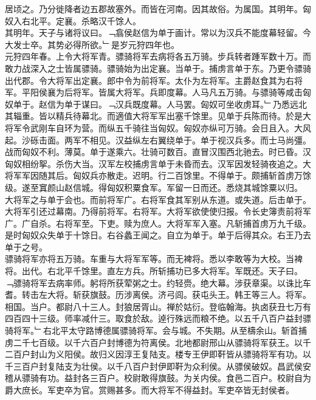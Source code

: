 \documentclass{zhvt-classic}
\begin{document}
\hspace*{2em}居顷之。乃分徙降者边五郡故塞外。而皆在河南。因其故俗。为属国。其明年。匈奴入右北平。定襄。杀略汉千馀人。\\
\hspace*{2em}其明年。天子与诸将议曰。﹁翕侯赵信为单于画计。常以为汉兵不能度幕轻留。今大发士卒。其势必得所欲。﹂是岁元狩四年也。\\
\hspace*{2em}元狩四年春。上令大将军青。骠骑将军去病将各五万骑。步兵转者踵军数十万。而敢力战深入之士皆属骠骑。骠骑始为出定襄。当单于。捕虏言单于东。乃更令骠骑出代郡。令大将军出定襄。郎中令为前将军。太仆为左将军。主爵赵食其为右将军。平阳侯襄为后将军。皆属大将军。兵即度幕。人马凡五万骑。与骠骑等咸击匈奴单于。赵信为单于谋曰。﹁汉兵既度幕。人马罢。匈奴可坐收虏耳。﹂乃悉远北其辎重。皆以精兵待幕北。而適值大将军军出塞千馀里。见单于兵陈而待。於是大将军令武刚车自环为营。而纵五千骑往当匈奴。匈奴亦纵可万骑。会日且入。大风起。沙砾击面。两军不相见。汉益纵左右翼绕单于。单于视汉兵多。而士马尚彊。战而匈奴不利。薄莫。单于遂乘六。壮骑可数百。直冒汉围西北驰去。时已昏。汉匈奴相纷挐。杀伤大当。汉军左校捕虏言单于未昏而去。汉军因发轻骑夜追之。大将军军因随其后。匈奴兵亦散走。迟明。行二百馀里。不得单于。颇捕斩首虏万馀级。遂至窴颜山赵信城。得匈奴积粟食军。军留一日而还。悉烧其城馀粟以归。\\
\hspace*{2em}大将军之与单于会也。而前将军广。右将军食其军别从东道。或失道。后击单于。大将军引还过幕南。乃得前将军。右将军。大将军欲使使归报。令长史簿责前将军广。广自杀。右将军至。下吏。赎为庶人。大将军军入塞。凡斩捕首虏万九千级。\\
\hspace*{2em}是时匈奴众失单于十馀日。右谷蠡王闻之。自立为单于。单于后得其众。右王乃去单于之号。\\
\hspace*{2em}骠骑将军亦将五万骑。车重与大将军军等。而无裨将。悉以李敢等为大校。当裨将。出代。右北平千馀里。直左方兵。所斩捕功已多大将军。军既还。天子曰。﹁骠骑将军去病率师。躬将所获荤粥之士。约轻赍。绝大幕。涉获章渠。以诛比车耆。转击左大将。斩获旗鼓。历涉离侯。济弓闾。获屯头王。韩王等三人。将军。相国。当户。都尉八十三人。封狼居胥山。禅於姑衍。登临翰海。执卤获丑七万有四百四十三级。师率减什三。取食於敌。逴行殊远而粮不绝。以五千八百户益封骠骑将军。﹂右北平太守路博德属骠骑将军。会与城。不失期。从至檮余山。斩首捕虏二千七百级。以千六百户封博德为符离侯。北地都尉邢山从骠骑将军获王。以千二百户封山为义阳侯。故归义因淳王复陆支。楼专王伊即靬皆从骠骑将军有功。以千三百户封复陆支为壮侯。以千八百户封伊即靬为众利侯。从骠侯破奴。昌武侯安稽从骠骑有功。益封各三百户。校尉敢得旗鼓。为关内侯。食邑二百户。校尉自为爵大庶长。军吏卒为官。赏赐甚多。而大将军不得益封。军吏卒皆无封侯者。\\
\end{document}
